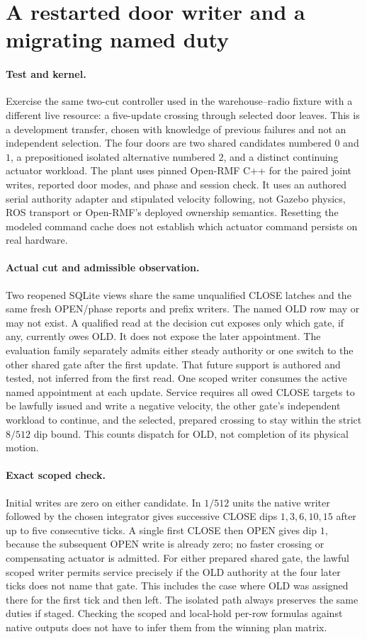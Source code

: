 \documentclass{article}
\begin{document}
\section*{A restarted door writer and a migrating named duty}
\paragraph{Test and kernel.}
Exercise the same two-cut controller used in the warehouse--radio fixture
with a different live resource: a five-update crossing through selected
door leaves. This is a development transfer, chosen with knowledge of
previous failures and not an independent selection. The four doors are
two shared candidates numbered $0$ and $1$, a prepositioned isolated
alternative numbered $2$, and a distinct continuing actuator workload.
The plant uses pinned Open-RMF C++ for the paired joint writes, reported
door modes, and phase and session check. It uses an authored serial
authority adapter and stipulated velocity following, not Gazebo physics,
ROS transport or Open-RMF's deployed ownership semantics. Resetting the
modeled command cache does not establish which actuator command persists
on real hardware.

\paragraph{Actual cut and admissible observation.}
Two reopened SQLite views share the same unqualified CLOSE latches and
the same fresh OPEN/phase reports and prefix writers. The named OLD row may
or may not exist. A qualified read at the decision cut exposes only which
gate, if any, currently owes OLD. It does not expose the later appointment.
The evaluation family separately admits either steady authority or one
switch to the other shared gate after the first update. That future support
is authored and tested, not inferred from the first read. One scoped
writer consumes the active named appointment at each update. Service
requires all owed CLOSE targets to be lawfully issued and write a negative
velocity, the other gate's independent workload to continue, and the
selected, prepared crossing to stay within the strict $8/512$ dip bound.
This counts dispatch for OLD, not completion of its physical motion.

\paragraph{Exact scoped check.}
Initial writes are zero on either candidate. In $1/512$ units the native
writer followed by the chosen integrator gives successive CLOSE dips
$1,3,6,10,15$ after up to five consecutive ticks. A single first CLOSE then
OPEN gives dip $1$, because the subsequent OPEN write is already zero; no
faster crossing or compensating actuator is admitted. For either prepared
shared gate, the lawful scoped writer permits service precisely if the
OLD authority at the four later ticks does not name that gate. This
includes the case where OLD was assigned there for the first tick and
then left. The isolated path always preserves the same duties if staged.
Checking the scoped and local-hold per-row formulas against native outputs
does not have to infer them from the winning plan matrix.
\end{document}
